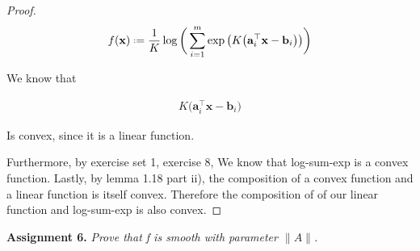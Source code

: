 \documentclass{article}
\newcommand*{\defeq}{\mathrel{\vcenter{\baselineskip0.5ex \lineskiplimit0pt
                     \hbox{\scriptsize.}\hbox{\scriptsize.}}}%
                     =}
\begin{document}
\begin{proof}
	\begin{align}
		f(\mathbf{x}) \defeq \frac{1}{K}\log\bigg( \sum^m_{i=1}\exp\big(K\big( \mathbf{a}_i^\top\mathbf{x} - \mathbf{b}_i\big) \big) \bigg)
	\end{align}
	
	We know that
	
	\begin{align}
		K\big( \mathbf{a}_i^\top\mathbf{x} - \mathbf{b}_i\big) 
	\end{align}
	
	Is convex, since it is a linear function.
	
	Furthermore, by exercise set 1, exercise 8, We know that log-sum-exp is a convex function. Lastly, by lemma 1.18 part ii), the composition of a convex function and a linear function is itself convex. Therefore the composition of of our linear function and log-sum-exp is also convex.
	
\end{proof}
	
\textbf{Assignment 6.} \textit{Prove that f is smooth with parameter $\|A\|$.}
\end{document}
